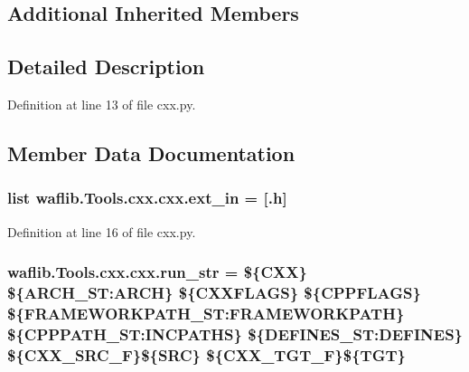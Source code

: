 \subsection*{Additional Inherited Members}


\subsection{Detailed Description}


Definition at line 13 of file cxx.\+py.



\subsection{Member Data Documentation}
\subsubsection[{\texorpdfstring{ext\+\_\+in}{ext_in}}]{\setlength{\rightskip}{0pt plus 5cm}list waflib.\+Tools.\+cxx.\+cxx.\+ext\+\_\+in = \mbox{[}\textquotesingle{}.h\textquotesingle{}\mbox{]}\hspace{0.3cm}{\ttfamily [static]}}\hypertarget{classwaflib_1_1_tools_1_1cxx_1_1cxx_ad0fcfcb8360726f879a7d50375cbffaa}{}\label{classwaflib_1_1_tools_1_1cxx_1_1cxx_ad0fcfcb8360726f879a7d50375cbffaa}


Definition at line 16 of file cxx.\+py.

\subsubsection[{\texorpdfstring{run\+\_\+str}{run_str}}]{ waflib.\+Tools.\+cxx.\+cxx.\+run\+\_\+str = \textquotesingle{}\$\{C\+XX\} \$\{A\+R\+C\+H\+\_\+\+S\+T\+:\+A\+R\+CH\} \$\{C\+X\+X\+F\+L\+A\+GS\} \$\{C\+P\+P\+F\+L\+A\+GS\} \$\{F\+R\+A\+M\+E\+W\+O\+R\+K\+P\+A\+T\+H\+\_\+\+S\+T\+:\+F\+R\+A\+M\+E\+W\+O\+R\+K\+P\+A\+TH\} \$\{C\+P\+P\+P\+A\+T\+H\+\_\+\+S\+T\+:\+I\+N\+C\+P\+A\+T\+HS\} \$\{D\+E\+F\+I\+N\+E\+S\+\_\+\+S\+T\+:\+D\+E\+F\+I\+N\+ES\} \$\{C\+X\+X\+\_\+\+S\+R\+C\+\_\+F\}\$\{S\+RC\} \$\{C\+X\+X\+\_\+\+T\+G\+T\+\_\+F\}\$\{T\+GT\}\textquotesingle{}\hspace{0.3cm}{\ttfamily [static]}}\hypertarget{classwaflib_1_1_tools_1_1cxx_1_1cxx_abecd57d6ff8c3cea4898c4b3ee85efd5}{}\label{classwaflib_1_1_tools_1_1cxx_1_1cxx_abecd57d6ff8c3cea4898c4b3ee85efd5}


